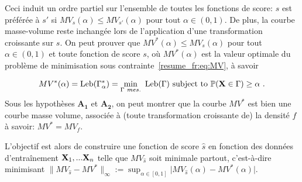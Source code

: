 Ceci induit un ordre partiel sur l'ensemble de toutes les fonctions de score: $ s $ est préférée à $s'$ si $MV_{s}(\alpha) \le MV_{s'}(\alpha)$ pour tout $\alpha \in (0,1) $. De plus, la courbe masse-volume reste inchangée lors de l'application d'une transformation croissante sur $ s $.
On peut prouver que $ MV ^ * (\alpha) \leq MV_s (\alpha) $ pour tout $ \alpha \in (0,1) $ et toute fonction de score $ s $, où $ MV ^ * (\alpha ) $ est la valeur optimale du problème de minimisation sous contrainte~\eqref{resume_fr:eq:MV}, à savoir

%
\begin{align}
\label{resume_fr:def:MV}
MV^*(\alpha)= \text{Leb}(\Gamma_\alpha^*)=\min_{\Gamma~ mes.} ~\text{Leb}(\Gamma) \mbox{~subject to~} \mathbb{P}(\mathbf X \in \Gamma) \ge \alpha~.
\end{align}
%
Sous les hypothèses $ \mathbf {A_1} $ et $ \mathbf {A_2} $, on peut montrer que la courbe $ MV^ * $ est bien une courbe masse volume, associée à (toute transformation croissante de) la densité $f$ à savoir: $ MV ^ * = MV_f $.

L'objectif est alors de construire une fonction de score $ \hat s $ en fonction des données d'entraînement $ \mathbf X_1, ... \mathbf X_n $ telle que $ MV_{\hat s} $ soit minimale partout, 
c'est-à-dire minimisant $\|MV_{\hat s}-MV^*\|_{\infty}:=\sup_{\alpha\in[0,1]}\vert MV_{\hat s}(\alpha)-MV^*(\alpha)\vert$.

